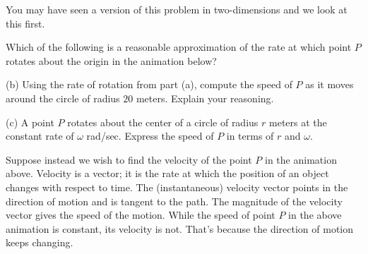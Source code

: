 \documentclass{ximera}
\begin{document}
 
\begin{onlineOnly}
    \begin{center}
\end{center}
\end{onlineOnly}





You may have seen a version of this problem in two-dimensions and we look at this first.


\begin{exploration}  \label{Qdstsdfgf:Cross}

\begin{question}   \label{Qdfg4bk:Cross}
Which of the following is a reasonable approximation of the rate at which point $P$ rotates about the origin in the animation below?
\begin{multipleChoice}  
\end{multipleChoice}  
\end{question}


(b) Using the rate of rotation from part (a), compute the speed of $P$ as it moves around the circle of radius $20$ meters. Explain your reasoning.

(c) A point $P$ rotates about the center of a circle of radius $r$ meters at the constant rate of $\omega$ rad/sec. Express the speed of $P$ in terms of $r$ and $\omega$.

 
\begin{onlineOnly}
    \begin{center}
\end{center}
\end{onlineOnly}


Suppose instead we wish to find the velocity of the point $P$ in the animation above. Velocity is a vector; it is the rate at which the position of an object changes with respect to time. The (instantaneous) velocity vector points in the direction of motion and is  tangent to the path. The magnitude of the velocity vector gives the speed of the motion. While the speed of point $P$ in the above animation is constant, its velocity is not. That's because the direction of motion keeps changing.


\end{exploration}
\end{document}
